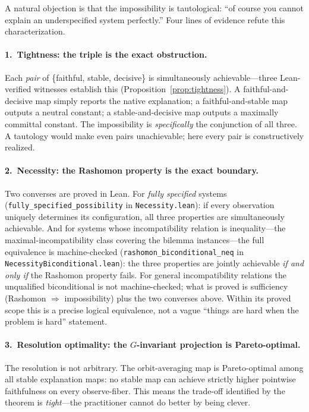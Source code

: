 \documentclass[11pt,a4paper]{article}
\begin{document}
A natural objection is that the impossibility is tautological: ``of course
you cannot explain an underspecified system perfectly.''  Four lines of
evidence refute this characterization.

\paragraph{1.\ Tightness: the triple is the exact obstruction.}
Each \emph{pair} of \{faithful, stable, decisive\} is simultaneously
achievable---three Lean-verified witnesses establish this
(Proposition~\ref{prop:tightness}).  A faithful-and-decisive map simply
reports the native explanation; a faithful-and-stable map outputs a neutral
constant; a stable-and-decisive map outputs a maximally committal constant.
The impossibility is \emph{specifically} the conjunction of all three.
A tautology would make even pairs unachievable; here every pair is
constructively realized.

\paragraph{2.\ Necessity: the Rashomon property is the exact boundary.}
Two converses are proved in Lean.  For \emph{fully specified} systems
(\texttt{fully\_specified\_possibility} in \texttt{Necessity.lean}): if every
observation uniquely determines its configuration, all three properties are
simultaneously achievable.  And for systems whose incompatibility relation is
inequality---the maximal-incompatibility class covering the bilemma
instances---the full equivalence is machine-checked
(\texttt{rashomon\_biconditional\_neq} in
\texttt{NecessityBiconditional.lean}): the three properties are jointly
achievable \emph{if and only if} the Rashomon property fails.  For general
incompatibility relations the unqualified biconditional is not
machine-checked; what is proved is sufficiency (Rashomon $\Rightarrow$
impossibility) plus the two converses above.  Within its proved scope this is
a precise logical equivalence, not a vague ``things are hard when the problem
is hard'' statement.

\paragraph{3.\ Resolution optimality: the $G$-invariant projection is
Pareto-optimal.}
The resolution is not arbitrary.  The orbit-averaging map is Pareto-optimal
among all stable explanation maps: no stable map can achieve strictly higher
pointwise faithfulness on every observe-fiber.  This means the trade-off
identified by the theorem is \emph{tight}---the practitioner cannot do better
by being clever.
\end{document}

